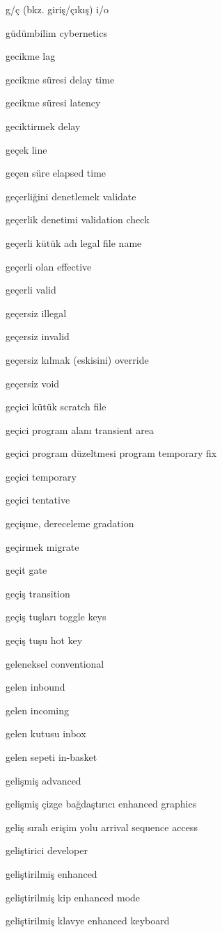 \documentclass[12pt,fleqn]{article}\usepackage{../../common}
\begin{document}
g/ç (bkz. giriş/çıkış) i/o

güdümbilim cybernetics

gecikme lag

gecikme süresi delay time

gecikme süresi latency

geciktirmek delay

geçek line

geçen süre elapsed time

geçerliğini denetlemek validate

geçerlik denetimi validation check

geçerli kütük adı legal file name

geçerli olan effective

geçerli valid

geçersiz illegal

geçersiz invalid

geçersiz kılmak (eskisini) override

geçersiz void

geçici kütük scratch file

geçici program alanı transient area

geçici program düzeltmesi program temporary fix

geçici temporary

geçici tentative

geçişme, dereceleme gradation

geçirmek migrate

geçit gate

geçiş transition

geçiş tuşları toggle keys

geçiş tuşu hot key

geleneksel conventional

gelen inbound

gelen incoming

gelen kutusu inbox

gelen sepeti in-basket

gelişmiş advanced

gelişmiş çizge bağdaştırıcı enhanced graphics

geliş sıralı erişim yolu arrival sequence access

geliştirici developer

geliştirilmiş enhanced

geliştirilmiş kip enhanced mode

geliştirilmiş klavye enhanced keyboard
\end{document}
